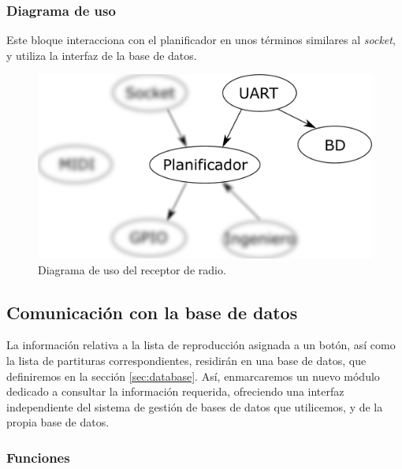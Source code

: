 \subsubsection{Diagrama de uso}

Este bloque interacciona con el planificador en unos términos similares al \textit{socket}, y utiliza la interfaz de la base de datos.

\smallskip

\begin{figure}[H]
	\noindent \begin{centering}
		\includegraphics[width=\linewidth/2]{capitulo4/daemon_uart}
		\par\end{centering}
	\smallskip
	\caption{\label{fig:daemon_uart} Diagrama de uso del receptor de radio.}
\end{figure} 

\smallskip

\subsection{Comunicación con la base de datos}

La información relativa a la lista de reproducción asignada a un botón, así como la lista de partituras correspondientes, residirán en una base de datos, que definiremos en la sección \ref{sec:database}. Así, enmarcaremos un nuevo módulo dedicado a consultar la información requerida, ofreciendo una interfaz independiente del sistema de gestión de bases de datos que utilicemos, y de la propia base de datos.

\subsubsection{Funciones}

